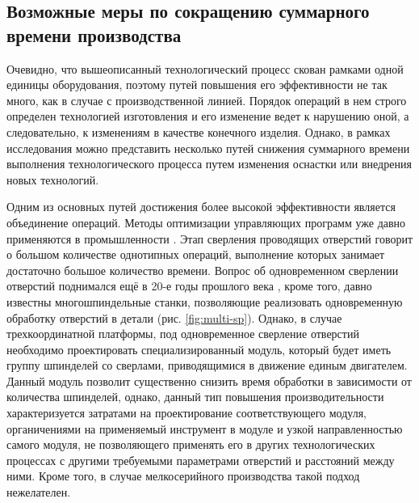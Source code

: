 \subsection{Возможные меры по сокращению суммарного времени производства} \label{ssect2_4_1}

Очевидно, что вышеописанный технологический процесс скован рамками одной единицы оборудования, поэтому путей повышения его эффективности не так много, как в случае с производственной линией. Порядок операций в нем строго определен технологией изготовления и его изменение ведет к нарушению оной, а следовательно, к изменениям в качестве конечного изделия. Однако, в рамках исследования можно представить несколько путей снижения суммарного времени выполнения технологического процесса путем изменения оснастки или внедрения новых технологий.

Одним из основных путей достижения более высокой эффективности является объединение операций. Методы оптимизации управляющих программ уже давно применяются в промышленности \cite{Streltsov}. Этап сверления проводящих отверстий говорит о большом количестве однотипных операций, выполнение которых занимает достаточно большое количество времени. Вопрос об одновременном сверлении отверстий поднимался ещё в 20-е годы прошлого века \cite{Efremov}, кроме того, давно известны многошпиндельные станки, позволяющие реализовать одновременную обработку отверстий в детали (рис. \cref{fig:multi-sp}). Однако, в случае трехкоординатной платформы, под одновременное сверление отверстий необходимо проектировать специализированный модуль, который будет иметь группу шпинделей со сверлами, приводящимися в движение единым двигателем. Данный модуль позволит существенно снизить время обработки в зависимости от количества шпинделей, однако, данный тип повышения производительности характеризуется затратами на проектирование соответствующего модуля, органичениями на применяемый инструмент в модуле и узкой направленностью самого модуля, не позволяющего применять его в других технологических процессах с другими требуемыми параметрами отверстий и расстояний между ними. Кроме того, в случае мелкосерийного производства такой подход нежелателен.

